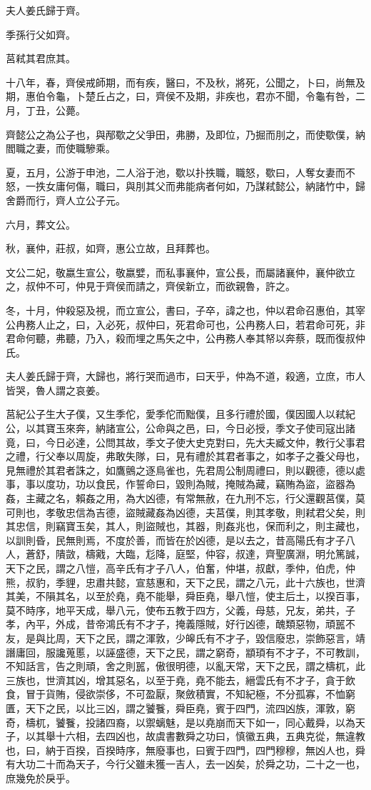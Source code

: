 \begin{pinyinscope}
夫人姜氏歸于齊。

季孫行父如齊。

莒弒其君庶其。

十八年，春，齊侯戒師期，而有疾，醫曰，不及秋，將死，公聞之，卜曰，尚無及期，惠伯令龜，卜楚丘占之，曰，齊侯不及期，非疾也，君亦不聞，令龜有咎，二月，丁丑，公薨。

齊懿公之為公子也，與邴歜之父爭田，弗勝，及即位，乃掘而刖之，而使歜僕，納閻職之妻，而使職驂乘。

夏，五月，公游于申池，二人浴于池，歜以扑抶職，職怒，歜曰，人奪女妻而不怒，一抶女庸何傷，職曰，與刖其父而弗能病者何如，乃謀弒懿公，納諸竹中，歸舍爵而行，齊人立公子元。

六月，葬文公。

秋，襄仲，莊叔，如齊，惠公立故，且拜葬也。

文公二妃，敬嬴生宣公，敬嬴嬖，而私事襄仲，宣公長，而屬諸襄仲，襄仲欲立之，叔仲不可，仲見于齊侯而請之，齊侯新立，而欲親魯，許之。

冬，十月，仲殺惡及視，而立宣公，書曰，子卒，諱之也，仲以君命召惠伯，其宰公冉務人止之，曰，入必死，叔仲曰，死君命可也，公冉務人曰，若君命可死，非君命何聽，弗聽，乃入，殺而埋之馬矢之中，公冉務人奉其帑以奔蔡，既而復叔仲氏。

夫人姜氏歸于齊，大歸也，將行哭而過市，曰天乎，仲為不道，殺適，立庶，市人皆哭，魯人謂之哀姜。

莒紀公子生大子僕，又生季佗，愛季佗而黜僕，且多行禮於國，僕因國人以弒紀公，以其寶玉來奔，納諸宣公，公命與之邑，曰，今日必授，季文子使司寇出諸竟，曰，今日必達，公問其故，季文子使大史克對曰，先大夫臧文仲，教行父事君之禮，行父奉以周旋，弗敢失隊，曰，見有禮於其君者事之，如孝子之養父母也，見無禮於其君者誅之，如鷹鸇之逐鳥雀也，先君周公制周禮曰，則以觀德，德以處事，事以度功，功以食民，作誓命曰，毀則為賊，掩賊為藏，竊賄為盜，盜器為姦，主藏之名，賴姦之用，為大凶德，有常無赦，在九刑不忘，行父還觀莒僕，莫可則也，孝敬忠信為吉德，盜賊藏姦為凶德，夫莒僕，則其孝敬，則弒君父矣，則其忠信，則竊寶玉矣，其人，則盜賊也，其器，則姦兆也，保而利之，則主藏也，以訓則昏，民無則焉，不度於善，而皆在於凶德，是以去之，昔高陽氏有才子八人，蒼舒，隤敳，檮戭，大臨，尨降，庭堅，仲容，叔達，齊聖廣淵，明允篤誠，天下之民，謂之八愷，高辛氏有才子八人，伯奮，仲堪，叔獻，季仲，伯虎，仲熊，叔豹，季貍，忠肅共懿，宣慈惠和，天下之民，謂之八元，此十六族也，世濟其美，不隕其名，以至於堯，堯不能舉，舜臣堯，舉八愷，使主后土，以揆百事，莫不時序，地平天成，舉八元，使布五教于四方，父義，母慈，兄友，弟共，子孝，內平，外成，昔帝鴻氏有不才子，掩義隱賊，好行凶德，醜類惡物，頑嚚不友，是與比周，天下之民，謂之渾敦，少皞氏有不才子，毀信廢忠，崇飾惡言，靖譖庸回，服讒蒐慝，以誣盛德，天下之民，謂之窮奇，顓頊有不才子，不可教訓，不知話言，告之則頑，舍之則嚚，傲很明德，以亂天常，天下之民，謂之檮杌，此三族也，世濟其凶，增其惡名，以至于堯，堯不能去，縉雲氏有不才子，貪于飲食，冒于貨賄，侵欲崇侈，不可盈厭，聚斂積實，不知紀極，不分孤寡，不恤窮匱，天下之民，以比三凶，謂之饕餮，舜臣堯，賓于四門，流四凶族，渾敦，窮奇，檮杌，饕餮，投諸四裔，以禦螭魅，是以堯崩而天下如一，同心戴舜，以為天子，以其舉十六相，去四凶也，故虞書數舜之功曰，慎徽五典，五典克從，無違教也，曰，納于百揆，百揆時序，無廢事也，曰賓于四門，四門穆穆，無凶人也，舜有大功二十而為天子，今行父雖未獲一吉人，去一凶矣，於舜之功，二十之一也，庶幾免於戾乎。


\end{pinyinscope}
